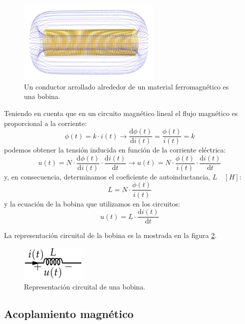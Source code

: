 \begin{figure}[H]
  \centering
  \begin{center}
    \includegraphics[height=4cm]{../figs/Solenoide.jpg}
  \end{center}
  \caption{Un conductor arrollado alrededor de un material ferromagnético es una bobina.}
  \label{fig:solenoide}
\end{figure}
Teniendo en cuenta que en un circuito magnético lineal el flujo magnético es proporcional a la corriente:
\[
  \phi(t) = k \cdot i(t) \rightarrow   \frac{\mathrm{d}\phi(t)}{\mathrm{d} i(t)} = \frac{\phi(t)}{i(t)} = k
\]
podemos obtener la tensión inducida en función de la corriente eléctrica:
\[
u(t) = N \cdot \frac{\mathrm{d}\phi(t)}{\mathrm{d} i(t)} \cdot  \frac{\mathrm{d}i(t)}{\mathrm{d} t} \rightarrow u(t) = N \cdot \frac{\phi(t)}{i(t)} \cdot \frac{\mathrm{d}i(t)}{\mathrm{d} t}
\]
y, en consecuencia, determinamos el coeficiente de autoinductancia, $L \quad [H]$:
\[
  \boxed{L = N \cdot \frac{\phi(t)}{i(t)}}
\]
y la ecuación de la bobina que utilizamos en los circuitos:
\begin{equation}
  \label{eq:bobina-VI}
  \boxed{u(t) = L \cdot \frac{\mathrm{d}i(t)}{\mathrm{d} t}}
\end{equation}

La representación circuital de la bobina es la mostrada en la figura \ref{fig:bobina-circuito}.
\begin{figure}[H]
  \centering
  \begin{center}
    \includegraphics[height=0.1\textheight]{../figs/Bobina.pdf}
  \end{center}
  \caption{Representación circuital de una bobina.}
  \label{fig:bobina-circuito}
\end{figure}

\subsection{Acoplamiento magnético}
\label{sec:acoplamiento}

